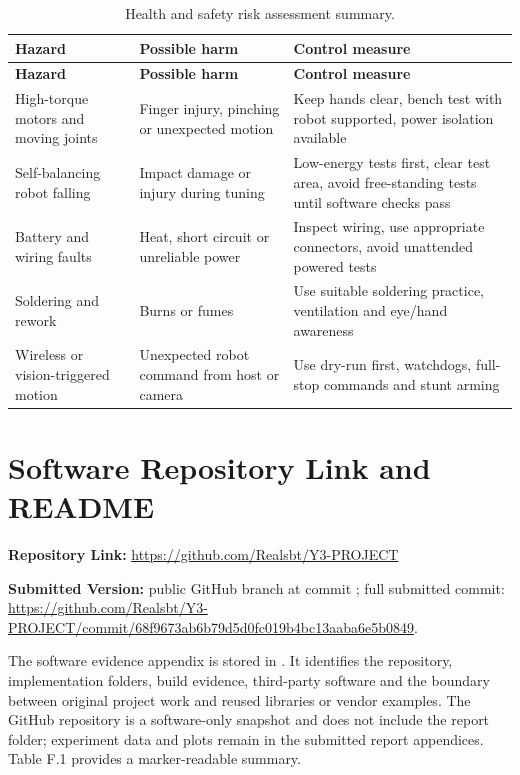 \documentclass[12pt, a4paper]{article}
\begin{document}
\begingroup
\singlespacing
\small
\setlength{\tabcolsep}{2pt}
\renewcommand{\arraystretch}{1.15}
\begin{longtable}{>{\RaggedRight\arraybackslash}p{}>{\RaggedRight\arraybackslash}p{}>{\RaggedRight\arraybackslash}p{}}
\caption{Health and safety risk assessment summary.}\\
\toprule
\textbf{Hazard} & \textbf{Possible harm} & \textbf{Control measure} \\
\midrule
\endfirsthead
\toprule
\textbf{Hazard} & \textbf{Possible harm} & \textbf{Control measure} \\
\midrule
\endhead
High-torque motors and moving joints & Finger injury, pinching or unexpected motion & Keep hands clear, bench test with robot supported, power isolation available \\
Self-balancing robot falling & Impact damage or injury during tuning & Low-energy tests first, clear test area, avoid free-standing tests until software checks pass \\
Battery and wiring faults & Heat, short circuit or unreliable power & Inspect wiring, use appropriate connectors, avoid unattended powered tests \\
Soldering and rework & Burns or fumes & Use suitable soldering practice, ventilation and eye/hand awareness \\
Wireless or vision-triggered motion & Unexpected robot command from host or camera & Use dry-run first, watchdogs, full-stop commands and stunt arming \\
\bottomrule
\end{longtable}
\endgroup

\clearpage
\section{Software Repository Link and README}
\textbf{Repository Link:} \url{https://github.com/Realsbt/Y3-PROJECT}

\textbf{Submitted Version:} public GitHub \texttt{} branch at commit \texttt{}; full submitted commit: \url{https://github.com/Realsbt/Y3-PROJECT/commit/68f9673ab6b79d5d0fc019b4bc13aaba6e5b0849}.

The software evidence appendix is stored in . It identifies the repository, implementation folders, build evidence, third-party software and the boundary between original project work and reused libraries or vendor examples. The GitHub repository is a software-only snapshot and does not include the report folder; experiment data and plots remain in the submitted report appendices. Table F.1 provides a marker-readable summary.
\end{document}
